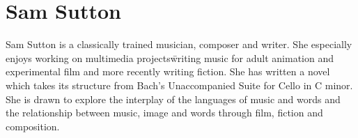 
% 
% 
% 
% 
% 
% 
% 
% 
% 

\section*{Sam Sutton}%

% 
% 
% 
% 
% 
% 

Sam Sutton %
is a classically trained
musician, composer and writer. She especially enjoys working on
multimedia projects\=writing music for adult animation and
experimental film and more recently writing fiction. She has written a
novel which takes its structure from Bach’s Unaccompanied Suite for
Cello in C minor. She is drawn to explore the interplay of the languages
of music and words and the relationship between music, image and words
through film, fiction and composition.

% 

